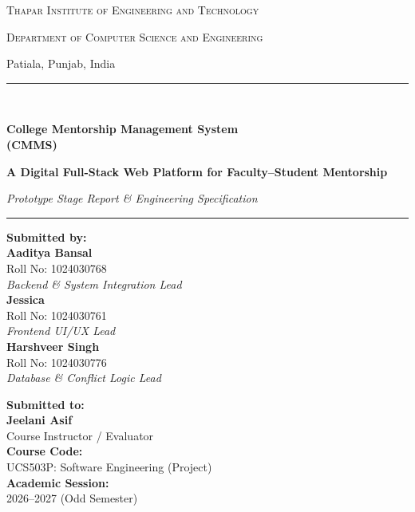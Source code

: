\documentclass[11pt,a4paper]{article}
\begin{document}
\begin{titlepage}
  \centering
  \vspace*{0.8cm}
  
  {\scshape\Large Thapar Institute of Engineering and Technology \par}
  \vspace{0.2cm}
  {\scshape\large Department of Computer Science and Engineering \par}
  \vspace{0.1cm}
  {\small Patiala, Punjab, India \par}
  
  \vspace{1.5cm}
  \rule{\linewidth}{1.5pt} \\[0.4cm]
  {\huge\bfseries\color{primary} College Mentorship Management System \\[0.2cm] (CMMS) \par}
  \vspace{0.3cm}
  {\large\bfseries\color{secondary} A Digital Full-Stack Web Platform for Faculty--Student Mentorship \par}
  \vspace{0.2cm}
  {\normalsize\itshape Prototype Stage Report \& Engineering Specification \par}
  \rule{\linewidth}{1.5pt}
  
  \vspace{1.5cm}
  
  \begin{minipage}[t]{0.48\textwidth}
    \textbf{\large Submitted by:}\\[0.4cm]
    \textbf{Aaditya Bansal} \\
    Roll No: 1024030768 \\
    \textit{Backend \& System Integration Lead} \\[0.3cm]
    \textbf{Jessica} \\
    Roll No: 1024030761 \\
    \textit{Frontend UI/UX Lead} \\[0.3cm]
    \textbf{Harshveer Singh} \\
    Roll No: 1024030776 \\
    \textit{Database \& Conflict Logic Lead}
  \end{minipage}
  \hfill
  \begin{minipage}[t]{0.48\textwidth}
    \raggedleft
    \textbf{\large Submitted to:}\\[0.4cm]
    \textbf{Jeelani Asif} \\
    Course Instructor / Evaluator \\[0.4cm]
    \textbf{Course Code:}\\[0.1cm]
    UCS503P: Software Engineering (Project) \\[0.4cm]
    \textbf{Academic Session:}\\[0.1cm]
    2026--2027 (Odd Semester)
  \end{minipage}
  

\end{titlepage}
\end{document}
